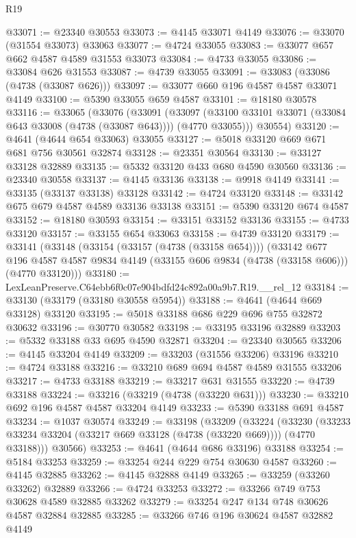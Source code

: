 \begin{lexlean}{R19}
\begin{coremodule}
@33071 := @23340 @30553
@33073 := @4145 @33071 @4149
@33076 := @33070 (@31554 @33073) @33063
@33077 := @4724 @33055
@33083 := @33077 @657 @662 @4587 @4589 @31553 @33073
@33084 := @4733 @33055
@33086 := @33084 @626 @31553
@33087 := @4739 @33055
@33091 := @33083 (@33086 (@4738 (@33087 @626)))
@33097 := @33077 @660 @196 @4587 @4587 @33071 @4149
@33100 := @5390 @33055 @659 @4587
@33101 := @18180 @30578
@33116 := @33065
    (@33076
      (@33091
        (@33097 (@33100 @33101 @33071 (@33084 @643 @33008 (@4738 (@33087 @643)))) (@4770 @33055)))
      @30554)
@33120 := @4641 (@4644 @654 @33063) @33055
@33127 := @5018 @33120 @669 @671 @681 @756 @30561 @32874
@33128 := @23351 @30564
@33130 := @33127 @33128 @32889
@33135 := @5332 @33120 @433 @680 @4590 @30560
@33136 := @23340 @30558
@33137 := @4145 @33136
@33138 := @9918 @4149
@33141 := @33135 (@33137 @33138) @33128
@33142 := @4724 @33120
@33148 := @33142 @675 @679 @4587 @4589 @33136 @33138
@33151 := @5390 @33120 @674 @4587
@33152 := @18180 @30593
@33154 := @33151 @33152 @33136
@33155 := @4733 @33120
@33157 := @33155 @654 @33063
@33158 := @4739 @33120
@33179 := @33141
    (@33148
      (@33154 (@33157 (@4738 (@33158 @654))))
      (@33142
        @677
        @196
        @4587
        @4587
        @9834
        @4149
        (@33155 @606 @9834 (@4738 (@33158 @606)))
        (@4770 @33120)))
@33180 := LexLeanPreserve.C64ebb6f0c07e904bdfd24c892a00a9b7.R19.__rel_12
@33184 := @33130 (@33179 (@33180 @30558 @5954))
@33188 := @4641 (@4644 @669 @33128) @33120
@33195 := @5018 @33188 @686 @229 @696 @755 @32872 @30632
@33196 := @30770 @30582
@33198 := @33195 @33196 @32889
@33203 := @5332 @33188 @33 @695 @4590 @32871
@33204 := @23340 @30565
@33206 := @4145 @33204 @4149
@33209 := @33203 (@31556 @33206) @33196
@33210 := @4724 @33188
@33216 := @33210 @689 @694 @4587 @4589 @31555 @33206
@33217 := @4733 @33188
@33219 := @33217 @631 @31555
@33220 := @4739 @33188
@33224 := @33216 (@33219 (@4738 (@33220 @631)))
@33230 := @33210 @692 @196 @4587 @4587 @33204 @4149
@33233 := @5390 @33188 @691 @4587
@33234 := @1037 @30574
@33249 := @33198
    (@33209
      (@33224
        (@33230 (@33233 @33234 @33204 (@33217 @669 @33128 (@4738 (@33220 @669)))) (@4770 @33188)))
      @30566)
@33253 := @4641 (@4644 @686 @33196) @33188
@33254 := @5184 @33253
@33259 := @33254 @244 @229 @754 @30630 @4587
@33260 := @4145 @32885
@33262 := @4145 @32888 @4149
@33265 := @33259 (@33260 @33262) @32889
@33266 := @4724 @33253
@33272 := @33266 @749 @753 @30628 @4589 @32885 @33262
@33279 := @33254 @247 @134 @748 @30626 @4587 @32884 @32885
@33285 := @33266 @746 @196 @30624 @4587 @32882 @4149

\end{coremodule}
\end{lexlean}
